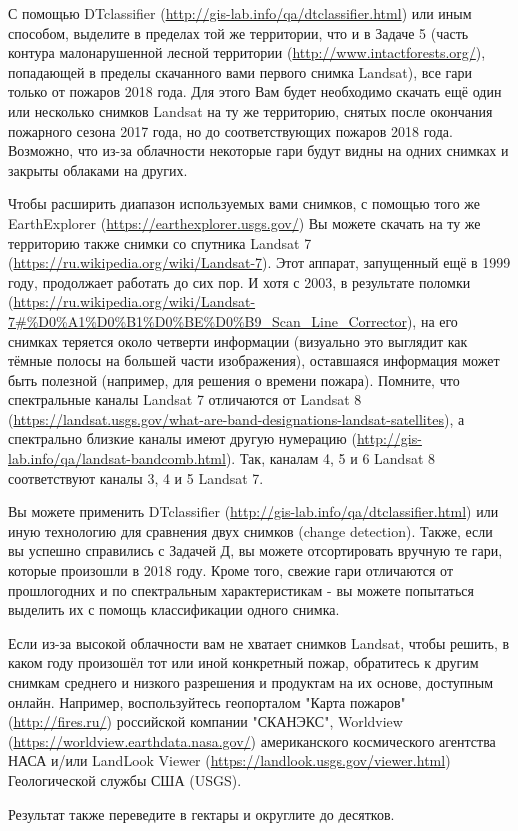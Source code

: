 
С помощью DTclassifier (\url{http://gis-lab.info/qa/dtclassifier.html}) или иным способом, выделите в 
пределах той же территории, 
что и в Задаче 5 (часть контура малонарушенной лесной территории (\url{http://www.intactforests.org/}), 
попадающей в пределы скачанного вами первого снимка Landsat), все гари только от пожаров 2018 года. Для этого Вам будет необходимо скачать ещё один или несколько снимков Landsat на ту же территорию, снятых после окончания пожарного сезона 2017 года, но до соответствующих пожаров 2018 года. Возможно, что из-за облачности некоторые гари будут видны на одних снимках и закрыты облаками на других.

Чтобы расширить диапазон используемых вами снимков, с помощью того же EarthExplorer (\url{https://earthexplorer.usgs.gov/}) 
Вы можете скачать на ту же территорию также снимки со спутника Landsat 7 (\url{https://ru.wikipedia.org/wiki/Landsat-7}). 
Этот аппарат, запущенный ещё в 1999 году, продолжает работать до сих пор. И хотя с 2003, в результате поломки (\url{https://ru.wikipedia.org/wiki/Landsat-7#%D0%A1%D0%B1%D0%BE%D0%B9_Scan_Line_Corrector}), 
на его снимках теряется около четверти информации (визуально это выглядит как тёмные полосы на большей 
части изображения), оставшаяся информация может быть полезной (например, для решения о времени пожара). 
Помните, что спектральные каналы Landsat 7 отличаются от Landsat 8 (\url{https://landsat.usgs.gov/what-are-band-designations-landsat-satellites}), 
а спектрально близкие каналы имеют другую нумерацию (\url{http://gis-lab.info/qa/landsat-bandcomb.html}). Так, каналам 4, 5 и 6 Landsat 8 соответствуют каналы 3, 4 и 5 Landsat 7. 

Вы можете применить DTclassifier (\url{http://gis-lab.info/qa/dtclassifier.html}) или иную технологию для сравнения двух снимков (change detection). Также, если вы успешно справились с Задачей Д, вы можете отсортировать вручную те гари, которые произошли в 2018 году. Кроме того, свежие гари отличаются от прошлогодних и по спектральным характеристикам - вы можете попытаться выделить их с помощь классификации одного снимка.

Если из-за высокой облачности вам не хватает снимков Landsat, чтобы решить, в каком году произошёл 
тот или иной конкретный пожар, обратитесь к другим снимкам среднего и низкого разрешения и продуктам 
на их основе, доступным онлайн. Например, воспользуйтесь геопорталом "Карта пожаров" (\url{http://fires.ru/}) 
российской компании "СКАНЭКС", Worldview (\url{https://worldview.earthdata.nasa.gov/}) американского 
космического агентства НАСА и/или LandLook Viewer (\url{https://landlook.usgs.gov/viewer.html}) Геологической службы США (USGS). 

Результат также переведите в гектары и округлите до десятков.